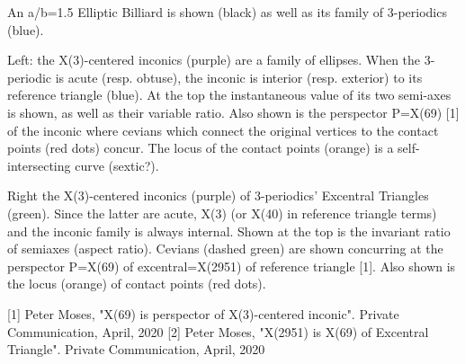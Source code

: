 An a/b=1.5 Elliptic Billiard is shown (black) as well as its family of 3-periodics (blue). 

Left: the X(3)-centered inconics (purple) are a family of ellipses. When the 3-periodic is acute (resp. obtuse), the inconic is interior (resp. exterior) to its reference triangle (blue). At the top the instantaneous value of its two semi-axes is shown, as well as their variable ratio. Also shown is the perspector P=X(69) [1] of the inconic where cevians which connect the original vertices to the contact points (red dots) concur. The locus of the contact points (orange) is a self-intersecting curve (sextic?). 

Right the X(3)-centered inconics (purple) of 3-periodics' Excentral Triangles (green). Since the latter are acute, X(3) (or X(40) in reference triangle terms) and the inconic family is always internal.  Shown at the top is the invariant ratio of semiaxes (aspect ratio). Cevians (dashed green) are shown concurring at the perspector P=X(69) of excentral=X(2951) of reference triangle [1]. Also shown is the locus (orange) of contact points (red dots).

[1] Peter Moses, "X(69) is perspector of X(3)-centered inconic". Private Communication, April, 2020
[2] Peter Moses, "X(2951) is X(69) of Excentral Triangle". Private Communication, April, 2020